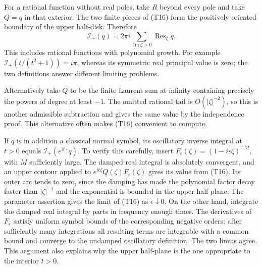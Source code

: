 \documentclass[
  11pt,
]{article}
\makeatletter
\let\ReaderOriginalAnchorStart\hyper@anchorstart
\let\ReaderOriginalAnchorEnd\hyper@anchorend
\let\ReaderPendingAliases\@empty
\def\ReaderArmAliases#1{\gdef\ReaderPendingAliases{#1}}
\def\hyper@anchorstart#1{\ReaderIfNativeAnchorTF{#1}{\ReaderPendingAliases\global\let\ReaderPendingAliases\@empty}{}\ReaderOriginalAnchorStart{#1}}
\makeatother
\begin{document}
For a rational function without real poles, take \(R\) beyond every pole
and take \(Q=q\) in that exterior. The two finite pieces of (T16) form
the positively oriented boundary of the upper half-disk. Therefore \[
\mathcal I_+(q)=2\pi i
\sum_{\operatorname{Im}\zeta>0}\operatorname{Res}_{\zeta}q.
\tag{T17}
\] This includes rational functions with polynomial growth. For example
\(\mathcal I_+(t/(t^2+1))=i\pi\), whereas its symmetric real principal
value is zero; the two definitions answer different limiting problems.

Alternatively take \(Q\) to be the finite Laurent sum at infinity
containing precisely the powers of degree at least \(-1\). The omitted
rational tail is \(O(|\zeta|^{-2})\), so this is another admissible
subtraction and gives the same value by the independence proof. This
alternative often makes (T16) convenient to compute.

If \(q\) is in addition a classical normal symbol, its oscillatory
inverse integral at \(t>0\) equals \(\mathcal I_+(e^{it\cdot}q)\). To
verify this carefully, insert
\(F_\epsilon(\zeta)=(1-i\epsilon\zeta)^{-M}\), with \(M\) sufficiently
large. The damped real integral is absolutely convergent, and an upper
contour applied to \(e^{it\zeta}Q(\zeta)F_\epsilon(\zeta)\) gives its
value from (T16). Its outer arc tends to zero, since the damping has
made the polynomial factor decay faster than \(|\zeta|^{-1}\) and the
exponential is bounded in the upper half-plane. The parameter assertion
gives the limit of (T16) as \(\epsilon\downarrow0\). On the other hand,
integrate the damped real integral by parts in frequency enough times.
The derivatives of \(F_\epsilon\) satisfy uniform symbol bounds of the
corresponding negative orders; after sufficiently many integrations all
resulting terms are integrable with a common bound and converge to the
undamped oscillatory definition. The two limits agree. This argument
also explains why the upper half-plane is the one appropriate to the
interior \(t>0\).

\ReaderArmAliases{\ReaderOriginalAnchorStart{AN03-TR-006}\ReaderOriginalAnchorEnd\begingroup\expandafter\def\csname @currentHref\endcsname{AN03-TR-006}\label{AN03-TR-006}\endgroup\ReaderOriginalAnchorStart{an03-tr-006-boundary-traces-of-every-layer-order}\ReaderOriginalAnchorEnd\begingroup\expandafter\def\csname @currentHref\endcsname{an03-tr-006-boundary-traces-of-every-layer-order}\label{an03-tr-006-boundary-traces-of-every-layer-order}\endgroup\ReaderOriginalAnchorStart{13-boundary-traces-of-every-layer-order}\ReaderOriginalAnchorEnd\begingroup\expandafter\def\csname @currentHref\endcsname{13-boundary-traces-of-every-layer-order}\label{13-boundary-traces-of-every-layer-order}\endgroup\ReaderOriginalAnchorStart{boundary-traces-of-every-layer-order}\ReaderOriginalAnchorEnd}
\end{document}
